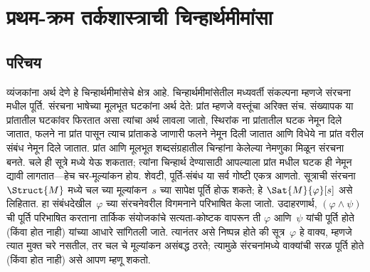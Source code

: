\chapter{प्रथम-क्रम तर्कशास्त्राची चिन्हार्थमीमांसा}\label{fol:sem::chap}









\section{परिचय}\label{fol:syn:its:sec}

व्यंजकांना अर्थ देणे हे चिन्हार्थमीमांसेचे क्षेत्र आहे. चिन्हार्थमीमांसेतील
मध्यवर्ती संकल्पना म्हणजे संरचना मधील पूर्ति. संरचना
भाषेच्या मूलभूत घटकांना अर्थ देते: प्रांत म्हणजे वस्तूंचा अरिक्त
संच. संख्यापक या प्रांतातील घटकांवर फिरतात असा त्यांचा अर्थ लावला जातो,
स्थिरांक ना प्रांतातील घटक नेमून दिले जातात, फलने ना
प्रांत पासून त्याच प्रांताकडे जाणारी फलने नेमून दिली जातात आणि
विधेये ना प्रांत वरील संबंध नेमून दिले जातात. प्रांत
आणि मूलभूत शब्दसंग्रहातील चिन्हांना केलेल्या नेमणुका मिळून
संरचना बनते.
चले ही सूत्रे मध्ये येऊ शकतात; त्यांना चिन्हार्थ देण्यासाठी
आपल्याला प्रांत मधील घटक ही नेमून द्यावी लागतात---हेच
चर-मूल्यांकन होय. शेवटी, पूर्ति-संबंध या सर्व गोष्टी एकत्र आणतो.
सूत्राची संरचना~$\Struct{M}$ मध्ये चल च्या
मूल्यांकन~$s$ च्या सापेक्ष पूर्ति होऊ शकते; हे $\Sat{M}{\varphi}[s]$ असे
लिहितात. हा संबंधदेखील~$\varphi$ च्या संरचनेवरील विगमनाने परिभाषित केला जातो.
उदाहरणार्थ, $(\varphi \land \psi)$ ची पूर्ति परिभाषित करताना तार्किक संयोजकांचे
सत्यता-कोष्टक वापरून ती $\varphi$ आणि~$\psi$ यांची पूर्ति होते (किंवा होत नाही)
यांच्या आधारे सांगितली जाते. त्यानंतर असे निष्पन्न होते की सूत्र~$\varphi$
हे वाक्य, म्हणजे त्यात मुक्त चरे नसतील, तर चल चे
मूल्यांकन असंबद्ध ठरते; त्यामुळे संरचनांमध्ये वाक्यांची
सरळ पूर्ति होते (किंवा होत नाही) असे आपण म्हणू शकतो.

